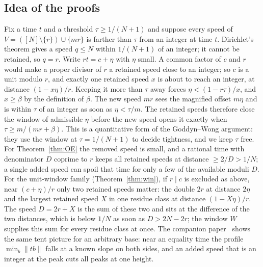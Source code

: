 \documentclass[11pt]{article}
\theoremstyle{definition}
\theoremstyle{remark}
\newcommand{\nd}[1]{\lVert #1\rVert}
\begin{document}
\subsection{Idea of the proofs}
Fix a time $t$ and a threshold $\tau\ge1/(N+1)$ and suppose every speed of $V=([N]\setminus\{r\})\cup\{mr\}$ is farther than $\tau$ from an integer at time $t$. Dirichlet's theorem gives a speed $q\le N$ within $1/(N+1)$ of an integer; it cannot be retained, so $q=r$. Write $rt=c+\eta$ with $\eta$ small. A common factor of $c$ and $r$ would make a proper divisor of $r$ a retained speed close to an integer; so $c$ is a unit modulo $r$, and exactly one retained speed $x$ is about to reach an integer, at distance $(1-x\eta)/r$. Keeping it more than $\tau$ away forces $\eta<(1-r\tau)/x$, and $x\ge\beta$ by the definition of $\beta$. The new speed $mr$ sees the magnified offset $m\eta$ and is within $\tau$ of an integer as soon as $\eta<\tau/m$. The retained speeds therefore close the window of admissible $\eta$ before the new speed opens it exactly when $\tau\ge m/(mr+\beta)$. This is a quantitative form of the Goddyn--Wong argument: they use the window at $\tau=1/(N+1)$ to decide tightness, and we keep $\tau$ free. For Theorem~\ref{thm:OE} the removed speed is small, and a rational time with denominator $D$ coprime to $r$ keeps all retained speeds at distance $\ge2/D>1/N$; a single added speed can spoil that time for only a few of the available moduli $D$. For the unit-window family (Theorem~\ref{thm:win}), if $r\mid c$ is excluded as above, near $(c+\eta)/r$ only two retained speeds matter: the double $2r$ at distance $2\eta$ and the largest retained speed $X$ in one residue class at distance $(1-X\eta)/r$. The speed $D=2r+X$ is the sum of these two and sits at the difference of the two distances, which is below $1/N$ as soon as $D>2N-2r$; the window $W$ supplies this sum for every residue class at once. The companion paper~\cite{A2} shows the same tent picture for an arbitrary base: near an equality time the profile $\min_{b}\nd{tb}$ falls at a known slope on both sides, and an added speed that is an integer at the peak cuts all peaks at one height.
\end{document}
